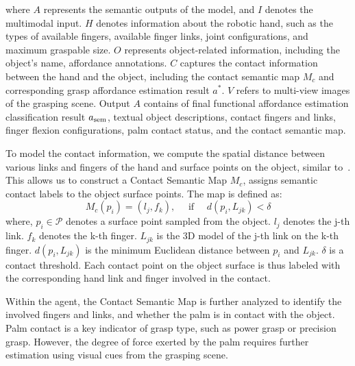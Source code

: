 where $A$ represents the semantic outputs of the model, and $I$ denotes the multimodal input. $H$ denotes information about the robotic hand, such as the types of available fingers, available finger links, joint configurations, and maximum graspable size. 
$O$ represents object-related information, including the object's name, affordance annotations. $C$ captures the contact information between the hand and the object, including the contact semantic map $M_c$ and corresponding grasp affordance estimation result $a^{*}$. 
$V$ refers to multi-view images of the grasping scene. Output $A$ contains of final functional affordance estimation classification result $a_{\rm sem}$, textual object descriptions, contact fingers and links, finger flexion configurations, palm contact status, and the contact semantic map.

To model the contact information, we compute the spatial distance between various links and fingers of the hand and surface points on the object, similar to~\cite{zhang2024contactdexnet}. This allows us to construct a Contact Semantic Map $M_c$, assigns semantic contact labels to the object surface points. The map is defined as:
\begin{equation}
M_c\left(p_i\right)=\left(l_j, f_k\right), \quad \text { if } \quad d\left(p_i, L_{j k}\right)<\delta
\end{equation}
where, $p_i \in \mathcal{P}$ denotes a surface point sampled from the object. $l_j$ denotes the 
j-th link. $f_k$ denotes the k-th finger. 
$L_{jk}$ is the 3D model of the j-th link on the k-th finger. $d(p_i, L_{jk})$ is the minimum Euclidean distance between $p_i$	
  and $L_{jk}$. $\delta$ is a contact threshold. Each contact point on the object surface is thus labeled with the corresponding hand link and finger involved in the contact.


Within the agent, the Contact Semantic Map is further analyzed to identify the involved fingers and links, and whether the palm is in contact with the object. Palm contact is a key indicator of grasp type, such as power grasp or precision grasp. However, the degree of force exerted by the palm requires further estimation using visual cues from the grasping scene.



